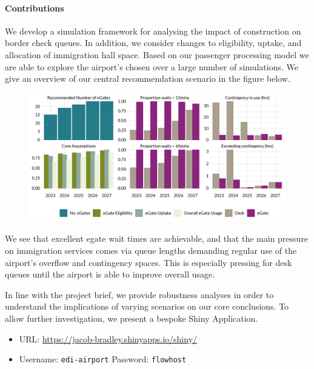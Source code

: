 \documentclass[10pt]{article}
\begin{document}
\paragraph{Contributions}
We develop a simulation framework for analysing the impact of  construction on border check queues. In addition, we consider changes to  eligibility, uptake, and allocation of immigration hall space. Based on our passenger processing model we are able to explore the airport's chosen  over a large number of simulations. We give an overview of our central recommendation scenario in the figure below. %
\begin{figure}[!h]
    \centering
    \includegraphics[width=\textwidth]{figures/core_rec_fig.png}
\end{figure}

\vspace{-5pt}

We see that excellent \gls{egate} wait times are achievable, and that the main pressure on immigration services comes via queue lengths demanding regular use of the airport's overflow and contingency spaces. This is especially pressing for desk queues until the airport is able to improve overall  usage. 

In line with the project brief, we provide robustness analyses in order to understand the implications of varying scenarios on our core conclusions. To allow further investigation, we present a bespoke Shiny Application. 

\begin{tcolorbox}[
colframe=edi-dark-purple,
colback=edi-light-purple,
fonttitle=\bfseries,
title = {Use our Shiny Application to interactively explore demand scenarios!}]
\vspace{-1.5mm}
\begin{itemize}
\item[\ding{40}] URL: \url{https://jacob-bradley.shinyapps.io/shiny/}
\item[\ding{40}] Username: \texttt{edi-airport} \quad Password: \texttt{flowhost}
\vspace{-1.5mm}
\end{itemize}
\end{tcolorbox}
\end{document}
